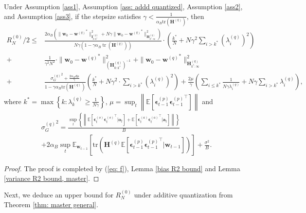 \documentclass[11pt, letterpaper]{article}
\begin{document}
\begin{theorem}
    \label{thm: master general}
    Under Assumption \ref{ass1}, Assumption \ref{ass: addd quantized}, Assumption \ref{ass2}, and Assumption \ref{ass3}, if the stepsize satisfies $\gamma < \frac{1}{\alpha_B\mathrm{tr}(\mathbf{H}^{(q)})}$, then
    \begin{equation*}
        \begin{aligned}
            R_N^{(0)}/2 \leq &\frac{2\alpha_B\left(\|\mathbf{w}_0-{\mathbf{w}^{(q)}}^*\|_{\mathbf{I}_{0:k^*}^{(q)}}^2+N\gamma\|\mathbf{w}_0-{\mathbf{w}^{(q)}}^*\|_{\mathbf{H}_{k^*:\infty}^{(q)}}^2\right)}{N\gamma(1-\gamma\alpha_B\operatorname{tr}(\mathbf{H}^{(q)}))}\cdot\left(\frac{k^*}{N}+N\gamma^2\sum_{i>k^*}(\lambda_i^{(q)})^2\right)\\
            +& \frac{1}{\gamma^2N^2}\cdot\|\mathbf{w}_0-{\mathbf{w}^{(q)}}^*\|_{(\mathbf{H}_{0:k^*}^{(q)})^{-1}}^2+\|\mathbf{w}_0-{\mathbf{w}^{(q)}}^*\|_{\mathbf{H}_{k^*:\infty}^{(q)}}^2\\
            +& \frac{{\sigma_G^{(q)}}^2+\frac{2\alpha_Bd\mu}{\gamma}}{1-\gamma\alpha_B\mathrm{tr}(\mathbf{H}^{(q)})}\left(\frac{k^*}{N}+N\gamma^2\cdot\sum_{i>k^*}(\lambda_i^{(q)})^2\right)+\frac{2\mu}{\gamma}\left(\sum_{i\leq k^*}\frac{1}{N\gamma\lambda_i^{(q)}}+N\gamma\sum_{i>k^*}\lambda_i^{(q)}\right),
        \end{aligned}
    \end{equation*}
    where $k^*=\max\left\{k: \lambda_k^{(q)} \geq \frac{1}{N\gamma}\right\}$, $\mu=\sup_t\left\|\mathbb{E}\left[\boldsymbol{\epsilon}_{t-1}^{(p)}{\boldsymbol{\epsilon}_{t-1}^{(p)}}^\top\right]\right\|$ and
    \begin{gather*}
        {\sigma_G^{(q)}}^2=\frac{\sup_t \left\{\left\|\mathbb{E}\left[\boldsymbol{\epsilon}_t^{(o)}{\boldsymbol{\epsilon}_t^{(o)}}^\top|\mathbf{o}_t\right]+\mathbb{E}\left[\boldsymbol{\epsilon}_t^{(a)}{\boldsymbol{\epsilon}_t^{(a)}}^\top|\mathbf{a}_t\right] \right\|\right\}}{B}\\
        +2\alpha_B\sup_t\mathbb{E}_{\mathbf{w}_{t-1}}\left[\mathrm{tr}\left(\mathbf{H}^{(q)} \mathbb{E}\left[\boldsymbol{\epsilon}_{t-1}^{(p)}{\boldsymbol{\epsilon}_{t-1}^{(p)}}^\top \big| \mathbf{w}_{t-1}\right]\right)\right]
        +\frac{\sigma^2}{B}.
    \end{gather*}
\end{theorem}
\begin{proof}
    The proof is completed by (\ref{eq: f}), Lemma \ref{bias R2 bound} and Lemma \ref{variance R2 bound, master}.
\end{proof}
Next, we deduce an upper bound for $R_N^{(0)}$ under additive quantization from Theorem \ref{thm: master general}.
\end{document}
